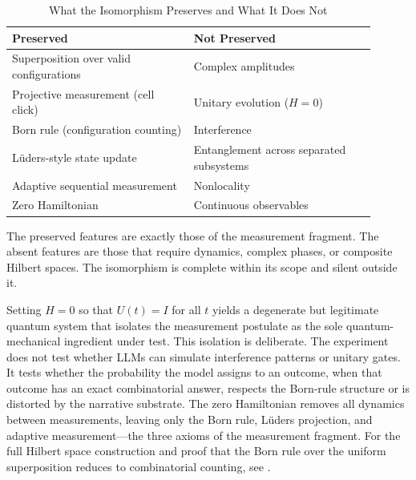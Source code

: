 \documentclass[12pt,a4paper]{article}
\begin{document}
\begin{table}[ht]
\centering
\caption{What the Isomorphism Preserves and What It Does Not}
\begin{tabular}{p{0.45\linewidth} p{0.45\linewidth}}
\toprule
\textbf{Preserved} & \textbf{Not Preserved} \\
\midrule
Superposition over valid configurations & Complex amplitudes \\
Projective measurement (cell click) & Unitary evolution ($H=0$) \\
Born rule (configuration counting) & Interference \\
L\"uders-style state update & Entanglement across separated subsystems \\
Adaptive sequential measurement & Nonlocality \\
Zero Hamiltonian & Continuous observables \\
\bottomrule
\end{tabular}
\end{table}

The preserved features are exactly those of the measurement fragment. The absent features are those that require dynamics, complex phases, or composite Hilbert spaces. The isomorphism is complete within its scope and silent outside it.

Setting $H = 0$ so that $U(t) = I$ for all $t$ yields a degenerate but legitimate quantum system that isolates the measurement postulate as the sole quantum-mechanical ingredient under test. This isolation is deliberate. The experiment does not test whether LLMs can simulate interference patterns or unitary gates. It tests whether the probability the model assigns to an outcome, when that outcome has an exact combinatorial answer, respects the Born-rule structure or is distorted by the narrative substrate. The zero Hamiltonian removes all dynamics between measurements, leaving only the Born rule, L\"uders projection, and adaptive measurement---the three axioms of the measurement fragment. For the full Hilbert space construction and proof that the Born rule over the uniform superposition reduces to combinatorial counting, see \citet{baldo2026}.
\end{document}
